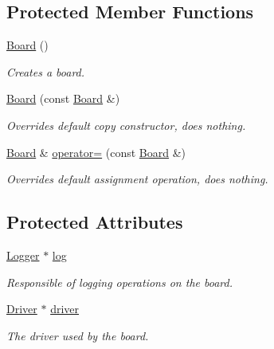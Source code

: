 \subsection*{Protected Member Functions}
\begin{CompactItemize}
\item 
\hyperlink{classmprace_1_1Board_b0}{Board} ()
\begin{CompactList}\small\item\em Creates a board. \item\end{CompactList}\item 
\hyperlink{classmprace_1_1Board_b1}{Board} (const \hyperlink{classmprace_1_1Board}{Board} \&)
\begin{CompactList}\small\item\em Overrides default copy constructor, does nothing. \item\end{CompactList}\item 
\hyperlink{classmprace_1_1Board}{Board} \& \hyperlink{classmprace_1_1Board_b2}{operator=} (const \hyperlink{classmprace_1_1Board}{Board} \&)
\begin{CompactList}\small\item\em Overrides default assignment operation, does nothing. \item\end{CompactList}\end{CompactItemize}
\subsection*{Protected Attributes}
\begin{CompactItemize}
\item 
\hyperlink{classmprace_1_1Logger}{Logger} $\ast$ \hyperlink{classmprace_1_1Board_p0}{log}
\begin{CompactList}\small\item\em Responsible of logging operations on the board. \item\end{CompactList}\item 
\hyperlink{classmprace_1_1Driver}{Driver} $\ast$ \hyperlink{classmprace_1_1Board_p1}{driver}
\begin{CompactList}\small\item\em The driver used by the board. \item\end{CompactList}\end{CompactItemize}


